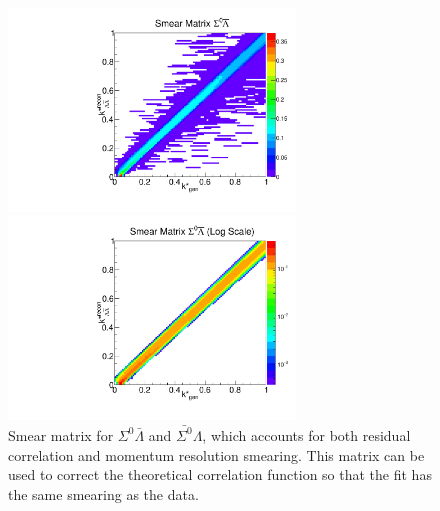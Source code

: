 \begin{figure}[h]
\begin{minipage}{18pc}
\includegraphics[width=18pc]{Figures/SmearMatrices/2016-7-19-SmearMatrixSigmaLambdaNormLA.pdf}
\end{minipage}\hspace{2pc}
\begin{minipage}{18pc}
\includegraphics[width=18pc]{Figures/SmearMatrices/2016-7-19-SmearMatrixSigmaLambdaNormLALog.pdf}
\end{minipage} 
\caption[Smear matrix -- $\Sigma^0\bar{\Lambda}$ and $\bar{\Sigma^0}\Lambda$]{
Smear matrix for $\Sigma^0\bar{\Lambda}$ and $\bar{\Sigma^0}\Lambda$, which accounts for both residual correlation and momentum resolution smearing. This matrix can be used to correct the theoretical correlation function so that the fit has the same smearing as the data.
}
\end{figure}


